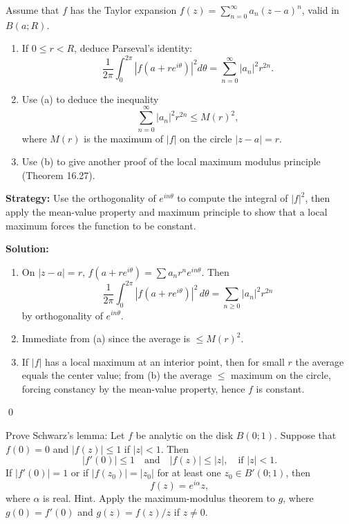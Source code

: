 \begin{problembox}
\begin{problemstatement}
Assume that \( f \) has the Taylor expansion \( f(z) = \sum_{n=0}^{\infty} a_n (z - a)^n \), valid in \( B(a; R) \).
\begin{enumerate}[label=(\alph*)]
\item If \( 0 \leq r < R \), deduce Parseval's identity:
\[ \frac{1}{2\pi} \int_0^{2\pi} |f(a + r e^{i\theta})|^2 d\theta = \sum_{n=0}^{\infty} |a_n|^2 r^{2n}. \]
\item Use (a) to deduce the inequality
\[ \sum_{n=0}^{\infty} |a_n|^2 r^{2n} \leq M(r)^2, \]
where \( M(r) \) is the maximum of \( |f| \) on the circle \( |z - a| = r \).
\item Use (b) to give another proof of the local maximum modulus principle (Theorem 16.27).
\end{enumerate}
\end{problemstatement}
\end{problembox}

\noindent\textbf{Strategy:} Use the orthogonality of \( e^{in\theta} \) to compute the integral of \( |f|^2 \), then apply the mean-value property and maximum principle to show that a local maximum forces the function to be constant.

\bigskip\noindent\textbf{Solution:}
\begin{enumerate}[label=(\alph*)]
\item On $|z-a|=r$, $f(a+re^{i\theta})=\sum a_n r^n e^{in\theta}$. Then
\[\frac{1}{2\pi}\int_0^{2\pi}|f(a+re^{i\theta})|^2\,d\theta=\sum_{n\ge0}|a_n|^2 r^{2n}\]
by orthogonality of $e^{in\theta}$.
\item Immediate from (a) since the average is $\le M(r)^2$.
\item If $|f|$ has a local maximum at an interior point, then for small $r$ the average equals the center value; from (b) the average $\le$ maximum on the circle, forcing constancy by the mean-value property, hence $f$ is constant.
\end{enumerate}\qed


\begin{problembox}
\begin{problemstatement}
Prove Schwarz's lemma: Let \( f \) be analytic on the disk \( B(0; 1) \). Suppose that \( f(0) = 0 \) and \( |f(z)| \leq 1 \) if \( |z| < 1 \). Then
\[ |f'(0)| \leq 1 \quad \text{and} \quad |f(z)| \leq |z|, \quad \text{if } |z| < 1. \]
If \( |f'(0)| = 1 \) or if \( |f(z_0)| = |z_0| \) for at least one \( z_0 \in B'(0; 1) \), then
\[ f(z) = e^{i\alpha} z, \]
where \( \alpha \) is real. Hint. Apply the maximum-modulus theorem to \( g \), where \( g(0) = f'(0) \) and \( g(z) = f(z)/z \) if \( z \neq 0 \).
\end{problemstatement}
\end{problembox}

